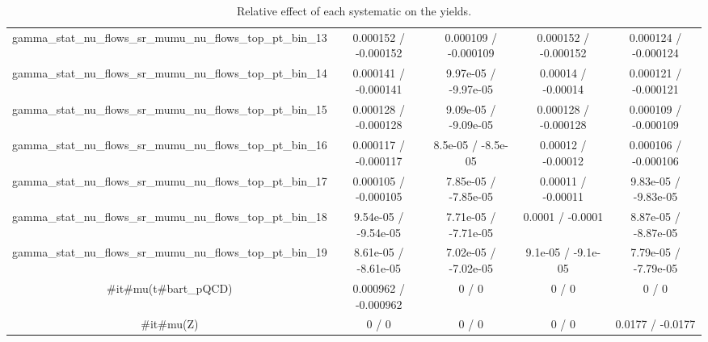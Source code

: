 \documentclass[10pt]{article}
\begin{document}
\begin{table}[htbp]
\begin{center}
\begin{tabular}{|c|c|c|c|c|}
  gamma_stat_nu_flows_sr_mumu_nu_flows_top_pt_bin_13 & 0.000152 / -0.000152 & 0.000109 / -0.000109 & 0.000152 / -0.000152 & 0.000124 / -0.000124 \\ 
  gamma_stat_nu_flows_sr_mumu_nu_flows_top_pt_bin_14 & 0.000141 / -0.000141 & 9.97e-05 / -9.97e-05 & 0.00014 / -0.00014 & 0.000121 / -0.000121 \\ 
  gamma_stat_nu_flows_sr_mumu_nu_flows_top_pt_bin_15 & 0.000128 / -0.000128 & 9.09e-05 / -9.09e-05 & 0.000128 / -0.000128 & 0.000109 / -0.000109 \\ 
  gamma_stat_nu_flows_sr_mumu_nu_flows_top_pt_bin_16 & 0.000117 / -0.000117 & 8.5e-05 / -8.5e-05 & 0.00012 / -0.00012 & 0.000106 / -0.000106 \\ 
  gamma_stat_nu_flows_sr_mumu_nu_flows_top_pt_bin_17 & 0.000105 / -0.000105 & 7.85e-05 / -7.85e-05 & 0.00011 / -0.00011 & 9.83e-05 / -9.83e-05 \\ 
  gamma_stat_nu_flows_sr_mumu_nu_flows_top_pt_bin_18 & 9.54e-05 / -9.54e-05 & 7.71e-05 / -7.71e-05 & 0.0001 / -0.0001 & 8.87e-05 / -8.87e-05 \\ 
  gamma_stat_nu_flows_sr_mumu_nu_flows_top_pt_bin_19 & 8.61e-05 / -8.61e-05 & 7.02e-05 / -7.02e-05 & 9.1e-05 / -9.1e-05 & 7.79e-05 / -7.79e-05 \\ 
  #it{#mu}(t#bar{t}_{pQCD}) & 0.000962 / -0.000962 & 0 / 0 & 0 / 0 & 0 / 0 \\ 
  #it{#mu}(Z) & 0 / 0 & 0 / 0 & 0 / 0 & 0.0177 / -0.0177 \\ 
\hline 
\end{tabular} 
\caption{Relative effect of each systematic on the yields.} 
\end{center} 
\end{table} 
\end{document}
